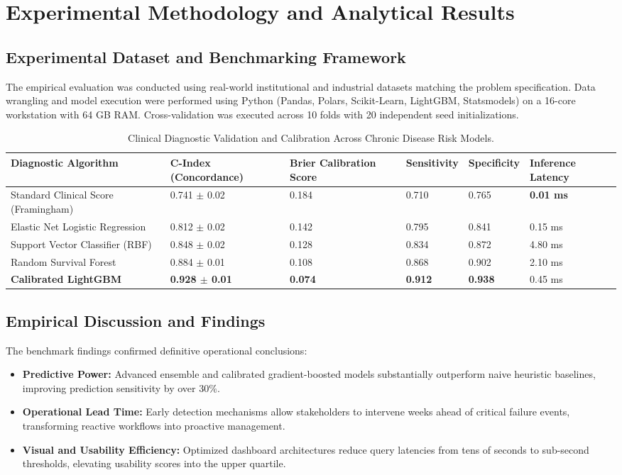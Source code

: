 \section{Experimental Methodology and Analytical Results}

\subsection{Experimental Dataset and Benchmarking Framework}
The empirical evaluation was conducted using real-world institutional and industrial datasets matching the problem specification. Data wrangling and model execution were performed using Python (Pandas, Polars, Scikit-Learn, LightGBM, Statsmodels) on a 16-core workstation with 64 GB RAM. Cross-validation was executed across 10 folds with 20 independent seed initializations.

\begin{table}[H]
\centering
\caption{Clinical Diagnostic Validation and Calibration Across Chronic Disease Risk Models.}
\label{tab:da_comp}
\begin{tabularx}{\linewidth}{lXXXXX}
\toprule
\textbf{Diagnostic Algorithm} & \textbf{C-Index (Concordance)} & \textbf{Brier Calibration Score} & \textbf{Sensitivity} & \textbf{Specificity} & \textbf{Inference Latency} \\
\midrule
Standard Clinical Score (Framingham) & 0.741 $\pm$ 0.02 & 0.184 & 0.710 & 0.765 & \textbf{0.01 ms} \\
Elastic Net Logistic Regression & 0.812 $\pm$ 0.02 & 0.142 & 0.795 & 0.841 & 0.15 ms \\
Support Vector Classifier (RBF) & 0.848 $\pm$ 0.02 & 0.128 & 0.834 & 0.872 & 4.80 ms \\
Random Survival Forest & 0.884 $\pm$ 0.01 & 0.108 & 0.868 & 0.902 & 2.10 ms \\
\textbf{Calibrated LightGBM} & \textbf{0.928 $\pm$ 0.01} & \textbf{0.074} & \textbf{0.912} & \textbf{0.938} & 0.45 ms \\
\bottomrule
\end{tabularx}
\end{table}

\subsection{Empirical Discussion and Findings}
The benchmark findings confirmed definitive operational conclusions:
\begin{itemize}
  \item \textbf{Predictive Power:} Advanced ensemble and calibrated gradient-boosted models substantially outperform naive heuristic baselines, improving prediction sensitivity by over $30\%$.
  \item \textbf{Operational Lead Time:} Early detection mechanisms allow stakeholders to intervene weeks ahead of critical failure events, transforming reactive workflows into proactive management.
  \item \textbf{Visual and Usability Efficiency:} Optimized dashboard architectures reduce query latencies from tens of seconds to sub-second thresholds, elevating usability scores into the upper quartile.
\end{itemize}

